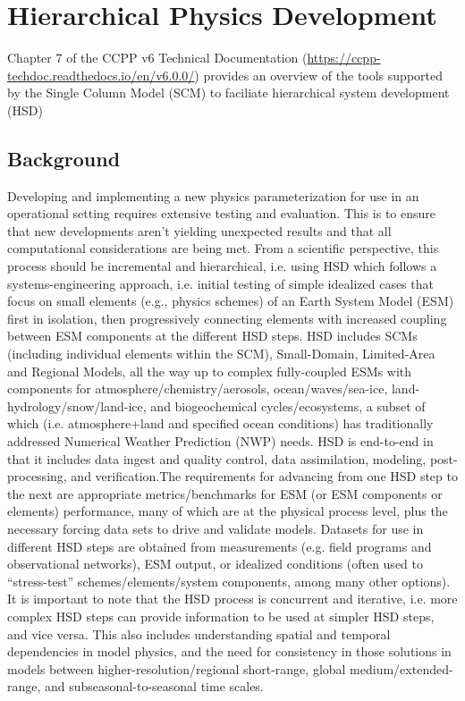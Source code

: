 \chapter{Hierarchical Physics Development}
\label{chapter: Hierarchical_Physics_Development}

Chapter 7 of the CCPP v6 Technical Documentation (\url{https://ccpp-techdoc.readthedocs.io/en/v6.0.0/}) provides an overview of the tools supported by the Single Column Model (SCM) to faciliate hierarchical system development (HSD)

\section{Background}

Developing and implementing a new physics parameterization for use in an operational setting requires extensive testing and evaluation. This is to ensure that new developments aren’t yielding unexpected results and that all computational considerations are being met. From a scientific perspective, this process should be incremental and hierarchical, i.e. using HSD which follows a systems-engineering approach, i.e. initial testing of simple idealized cases that focus on small elements (e.g., physics schemes) of an Earth System Model (ESM) first in isolation, then progressively connecting elements with increased coupling between ESM components at the different HSD steps. HSD includes SCMs (including individual elements within the SCM), Small-Domain, Limited-Area and Regional Models, all the way up to complex fully-coupled ESMs with components for atmosphere/chemistry/aerosols, ocean/waves/sea-ice, land-hydrology/snow/land-ice, and biogeochemical cycles/ecosystems, a subset of which (i.e. atmosphere+land and specified ocean conditions) has traditionally addressed Numerical Weather Prediction (NWP) needs. HSD is end-to-end in that it includes data ingest and quality control, data assimilation, modeling, post-processing, and verification.The requirements for advancing from one HSD step to the next are appropriate metrics/benchmarks for ESM (or ESM components or elements) performance, many of which are at the physical process level, plus the necessary forcing data sets to drive and validate models. Datasets for use in different HSD steps are obtained from measurements (e.g. field programs and observational networks), ESM output, or idealized conditions (often used to “stress-test” schemes/elements/system components, among many other options). It is important to note that the HSD process is concurrent and iterative, i.e. more complex HSD steps can provide information to be used at simpler HSD steps, and vice versa. This also includes understanding spatial and temporal dependencies in model physics, and the need for consistency in those solutions in models between higher-resolution/regional short-range, global medium/extended-range, and subseasonal-to-seasonal time scales.

